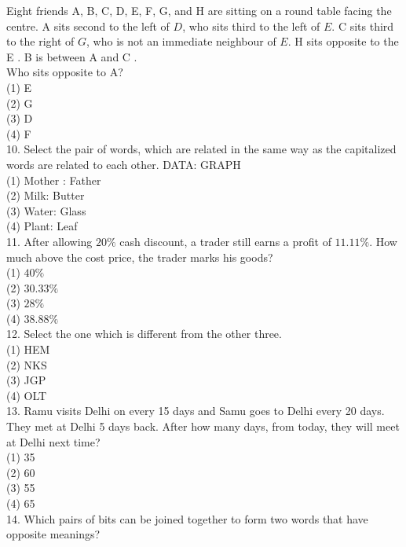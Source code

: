 \documentclass[10pt]{article}
\begin{document}
Eight friends A, B, C, D, E, F, G, and H are sitting on a round table facing the centre. A sits second to the left of $D$, who sits third to the left of $E$. C sits third to the right of $G$, who is not an immediate neighbour of $E$. H sits opposite to the E . B is between A and C .\\
Who sits opposite to A?\\
(1) E\\
(2) G\\
(3) D\\
(4) F\\
10. Select the pair of words, which are related in the same way as the capitalized words are related to each other. DATA: GRAPH\\
(1) Mother : Father\\
(2) Milk: Butter\\
(3) Water: Glass\\
(4) Plant: Leaf\\
11. After allowing $20 \%$ cash discount, a trader still earns a profit of $11.11 \%$. How much above the cost price, the trader marks his goods?\\
(1) $40 \%$\\
(2) $30.33 \%$\\
(3) $28 \%$\\
(4) $38.88 \%$\\
12. Select the one which is different from the other three.\\
(1) HEM\\
(2) NKS\\
(3) JGP\\
(4) OLT\\
13. Ramu visits Delhi on every 15 days and Samu goes to Delhi every 20 days. They met at Delhi 5 days back. After how many days, from today, they will meet at Delhi next time?\\
(1) 35\\
(2) 60\\
(3) 55\\
(4) 65\\
14. Which pairs of bits can be joined together to form two words that have opposite meanings?
\end{document}
